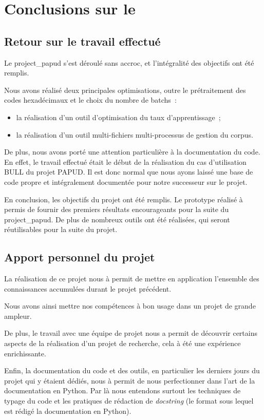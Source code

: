 \chapter{Conclusions sur le }

\section{Retour sur le travail effectué}
Le \gls{project_papud} s'est déroulé sans accroc, et l'intégralité des objectifs ont été remplis.

Nous avons réalisé deux principales optimisations, outre le prétraitement des codes hexadécimaux et le choix du nombre de \glspl{batch}~:
\begin{itemize}
	\item la réalisation d'un outil d'optimisation du taux d'apprentissage~;
	\item la réalisation d'un outil multi-fichiers multi-processus de gestion du corpus.
\end{itemize} %
\hspace{1em}

De plus, nous avons porté une attention particulière à la documentation du code.
En effet, le travail effectué était le début de la réalisation du cas d'utilisation BULL du projet PAPUD.
Il est donc normal que nous ayons laissé une base de code propre et intégralement documentée pour notre successeur sur le projet.

En conclusion, les objectifs du projet ont été remplis. Le prototype réalisé à permis de fournir des premiers résultats encourageants pour la suite du \gls{project_papud}. De plus de nombreux outils ont été réalisées, qui seront réutilisables pour la suite du projet.

\section{Apport personnel du projet}
La réalisation de ce projet nous à permit de mettre en application l'ensemble des connaissances accumulées durant le projet précédent.

Nous avons ainsi mettre nos compétences à bon usage dans un projet de grande ampleur.

De plus, le travail avec une équipe de projet nous a permit de découvrir certains aspects de la réalisation d'un projet de recherche, cela à été une expérience enrichissante.

Enfin, la documentation du code et des outils, en particulier les derniers jours du projet qui y étaient dédiés, nous à permit de nous perfectionner dans l'art de la documentation en Python.
Par là nous entendons surtout les techniques de typage du code \autocite{pep483,pep484} et les pratiques de rédaction de \textit{docstring} (le format sous lequel est rédigé la documentation en Python).

